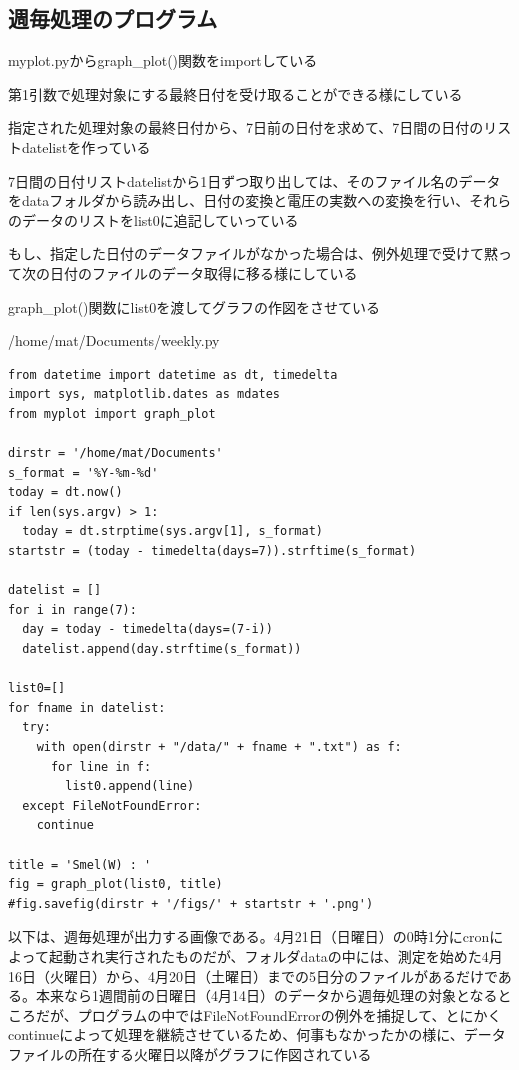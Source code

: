 \documentclass[12pt,a4j]{jsbook}
\begin{document}
\subsection{週毎処理のプログラム}

	myplot.pyからgraph\_plot()関数をimportしている

	第1引数で処理対象にする最終日付を受け取ることができる様にしている

	指定された処理対象の最終日付から、7日前の日付を求めて、7日間の日付のリストdatelistを作っている

	7日間の日付リストdatelistから1日ずつ取り出しては、そのファイル名のデータをdataフォルダから読み出し、日付の変換と電圧の実数への変換を行い、それらのデータのリストをlist0に追記していっている

	もし、指定した日付のデータファイルがなかった場合は、例外処理で受けて黙って次の日付のファイルのデータ取得に移る様にしている

	graph\_plot()関数にlist0を渡してグラフの作図をさせている
\begin{spacing}{0.87}
\begin{itembox}[l]{/home/mat/Documents/weekly.py}
\begin{verbatim}
from datetime import datetime as dt, timedelta
import sys, matplotlib.dates as mdates
from myplot import graph_plot

dirstr = '/home/mat/Documents'
s_format = '%Y-%m-%d'
today = dt.now()
if len(sys.argv) > 1:
  today = dt.strptime(sys.argv[1], s_format)
startstr = (today - timedelta(days=7)).strftime(s_format)

datelist = []
for i in range(7):
  day = today - timedelta(days=(7-i))
  datelist.append(day.strftime(s_format))

list0=[]
for fname in datelist:
  try:
    with open(dirstr + "/data/" + fname + ".txt") as f:
      for line in f:
        list0.append(line)
  except FileNotFoundError:
    continue

title = 'Smel(W) : '
fig = graph_plot(list0, title)
#fig.savefig(dirstr + '/figs/' + startstr + '.png')
\end{verbatim}
\end{itembox}
\end{spacing}


以下は、週毎処理が出力する画像である。4月21日（日曜日）の0時1分にcronによって起動され実行されたものだが、フォルダdataの中には、測定を始めた4月16日（火曜日）から、4月20日（土曜日）までの5日分のファイルがあるだけである。本来なら1週間前の日曜日（4月14日）のデータから週毎処理の対象となるところだが、プログラムの中ではFileNotFoundErrorの例外を捕捉して、とにかくcontinueによって処理を継続させているため、何事もなかったかの様に、データファイルの所在する火曜日以降がグラフに作図されている
\end{document}

